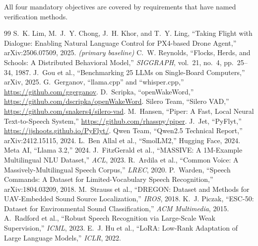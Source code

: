 \documentclass[11pt,a4paper]{article}
\begin{document}
\noindent All four mandatory objectives are covered by requirements that have named verification methods.

\begin{thebibliography}{99}
\small
{} S.~K. Lim, M.~J.~Y. Chong, J.~H. Khor, and T.~Y. Ling, ``Taking Flight with Dialogue:
  Enabling Natural Language Control for PX4-based Drone Agent,'' arXiv:2506.07509, 2025.
  \emph{(primary baseline)}
 C.~W. Reynolds, ``Flocks, Herds, and Schools: A Distributed Behavioral Model,''
  \emph{SIGGRAPH}, vol.~21, no.~4, pp.~25--34, 1987.
 J.~Gou et al., ``Benchmarking 25 LLMs on Single-Board Computers,'' arXiv, 2025.
 G.~Gerganov, ``llama.cpp'' and ``whisper.cpp,'' \url{https://github.com/ggerganov}.
 D.~Scripka, ``openWakeWord,'' \url{https://github.com/dscripka/openWakeWord}.
 Silero Team, ``Silero VAD,'' \url{https://github.com/snakers4/silero-vad}.
 M.~Hansen, ``Piper: A Fast, Local Neural Text-to-Speech System,''
  \url{https://github.com/rhasspy/piper}.
 J.~Jet, ``PyFlyt,'' \url{https://jjshoots.github.io/PyFlyt/}.
 Qwen Team, ``Qwen2.5 Technical Report,'' arXiv:2412.15115, 2024.
 L.~Ben Allal et al., ``SmolLM2,'' Hugging Face, 2024.
 Meta AI, ``Llama 3.2,'' 2024.
 J.~FitzGerald et al., ``MASSIVE: A 1M-Example Multilingual NLU Dataset,''
  \emph{ACL}, 2023.
 R.~Ardila et al., ``Common Voice: A Massively-Multilingual Speech Corpus,''
  \emph{LREC}, 2020.
 P.~Warden, ``Speech Commands: A Dataset for Limited-Vocabulary Speech
  Recognition,'' arXiv:1804.03209, 2018.
 M.~Strauss et al., ``DREGON: Dataset and Methods for UAV-Embedded Sound Source
  Localization,'' \emph{IROS}, 2018.
 K.~J. Piczak, ``ESC-50: Dataset for Environmental Sound Classification,''
  \emph{ACM Multimedia}, 2015.
 A.~Radford et al., ``Robust Speech Recognition via Large-Scale Weak Supervision,''
  \emph{ICML}, 2023.
 E.~J. Hu et al., ``LoRA: Low-Rank Adaptation of Large Language Models,''
  \emph{ICLR}, 2022.
\end{thebibliography}
\end{document}
